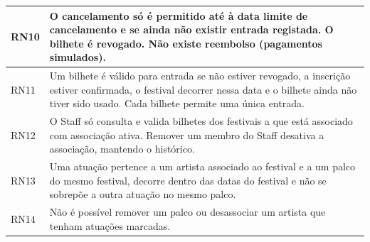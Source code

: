 \begin{longtable}{|l|p{12.4cm}|}
RN10 & O cancelamento só é permitido até à data limite de cancelamento e se ainda não existir entrada registada. O bilhete é revogado. Não existe reembolso (pagamentos simulados). \\ \hline
RN11 & Um bilhete é válido para entrada se não estiver revogado, a inscrição estiver confirmada, o festival decorrer nessa data e o bilhete ainda não tiver sido usado. Cada bilhete permite uma única entrada. \\ \hline
RN12 & O Staff só consulta e valida bilhetes dos festivais a que está associado com associação ativa. Remover um membro do Staff desativa a associação, mantendo o histórico. \\ \hline
RN13 & Uma atuação pertence a um artista associado ao festival e a um palco do mesmo festival, decorre dentro das datas do festival e não se sobrepõe a outra atuação no mesmo palco. \\ \hline
RN14 & Não é possível remover um palco ou desassociar um artista que tenham atuações marcadas. \\ \hline
\end{longtable}
